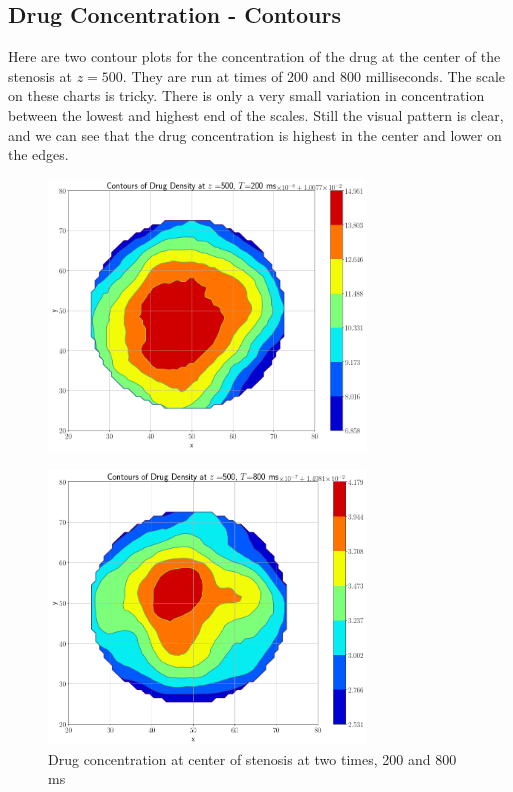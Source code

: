 \documentclass[11pt]{article} %
\begin{document}
\subsection{Drug Concentration - Contours}
Here are two contour plots for the concentration of the drug at the center of the stenosis
at $z=500$.  They are run at times of 200 and 800 milliseconds.
The scale on these charts is tricky.  
There is only a very small variation in concentration between the lowest and highest end of the scales.  
Still the visual pattern is clear, and we can see that the drug concentration is highest in the
center and lower on the edges.
\begin{figure}[H]
\centering
\hspace*{-0.25in}
\vspace*{-0.50in}
\includegraphics[width=0.75\textwidth]{contour_drug/contour_drug_z_500_t_200.png}
\end{figure}
\begin{figure}[H]
\centering
\hspace*{-0.25in}
\vspace*{-0.50in}
\includegraphics[width=0.75\textwidth]{contour_drug/contour_drug_z_500_t_800.png}
\caption{Drug concentration at center of stenosis at two times, 200 and 800 ms}
\end{figure}
\end{document}
